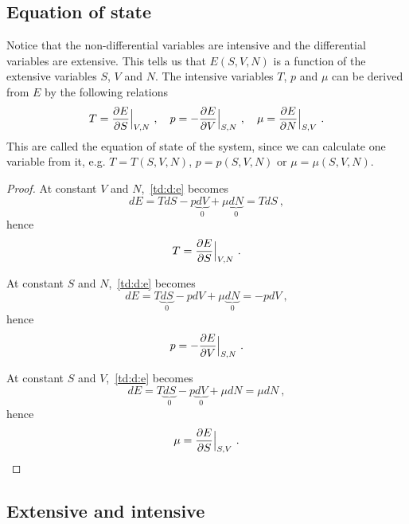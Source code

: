 \subsection{Equation of state}

    Notice that the non-differential variables are intensive and the differential variables are extensive. This tells us that $E(S, V, N)$ is a function of the extensive variables $S$, $V$ and $N$. The intensive variables $T$, $p$ and $\mu$ can be derived from $E$ by the following relations 
    \begin{equation}\label{td:es:e}
        T = \frac{\partial E}{\partial S} \Big \vert_{V,N} ~, \quad p = - \frac{\partial E}{\partial V} \Big \vert_{S,N} ~, \quad \mu = \frac{\partial E}{\partial N} \Big \vert_{S,V} ~. 
    \end{equation}
    This are called the equation of state of the system, since we can calculate one variable from it, e.g. $T = T(S,V,N)$, $p = p(S,V,N)$ or $\mu = \mu(S,V,N)$. 
    \begin{proof}
        At constant $V$ and $N$,~\eqref{td:d:e} becomes
        \begin{equation*}
            dE = TdS - p \underbrace{dV}_0 + \mu \underbrace{dN}_0 = TdS ~,
        \end{equation*}
        hence 
        \begin{equation*}
            T = \frac{\partial E}{\partial S} \Big \vert_{V,N} ~.
        \end{equation*}

        At constant $S$ and $N$,~\eqref{td:d:e} becomes
        \begin{equation*}
            dE = T\underbrace{dS}_0 - p dV + \mu \underbrace{dN}_0 = - p dV ~,
        \end{equation*}
        hence 
        \begin{equation*}
            p = - \frac{\partial E}{\partial V} \Big \vert_{S,N} ~.
        \end{equation*}

        At constant $S$ and $V$,~\eqref{td:d:e} becomes
        \begin{equation*}
            dE = T\underbrace{dS}_0 - p \underbrace{dV}_0 + \mu dN = \mu dN ~,
        \end{equation*}
        hence 
        \begin{equation*}
            \mu = \frac{\partial E}{\partial S} \Big \vert_{S,V} ~.
        \end{equation*}
    \end{proof}

\subsection{Extensive and intensive}

